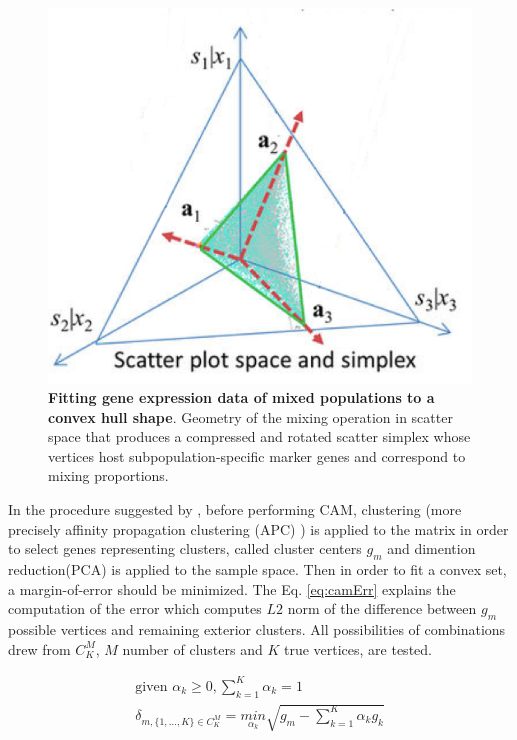 \documentclass[12pt,]{book}
\theoremstyle{definition}
\theoremstyle{definition}
\theoremstyle{definition}
\theoremstyle{remark}
\begin{document}
\begin{figure}

{\centering \includegraphics[width=0.5\linewidth]{figures-ext/cam} 

}

\caption[Fitting gene expression data of mixed populations to a convex hull shape]{\textbf{Fitting gene expression data of mixed
populations to a convex hull shape}. Geometry of the mixing operation in
scatter space that produces a compressed and rotated scatter simplex
whose vertices host subpopulation-specific marker genes and correspond
to mixing proportions.}\label{fig:cam}
\end{figure}







In the procedure suggested by \citet{Wang2013}, before performing CAM,
clustering (more precisely affinity propagation clustering (APC) ) is
applied to the matrix in order to select genes representing clusters,
called cluster centers \(g_m\) and dimention reduction(PCA) is applied
to the sample space. Then in order to fit a convex set, a
margin-of-error should be minimized. The Eq. \eqref{eq:camErr} explains
the computation of the error which computes \(L2\) norm of the
difference between \(g_m\) possible vertices and remaining exterior
clusters. All possibilities of combinations drew from \(C^M_K\), \(M\)
number of clusters and \(K\) true vertices, are tested.

\begin{equation}
\begin{aligned}
\text{given }\alpha_k \geq 0, \sum^K_{k=1}\alpha_k=1 \\
\delta_{m, \{1,...,K\} \in C^M_K }= \underset{\alpha_k}{min} \sqrt{{g_m} - \sum^K_{k=1}\alpha_kg_k} \label{eq:camErr}
\end{aligned}
\end{equation}
\end{document}
